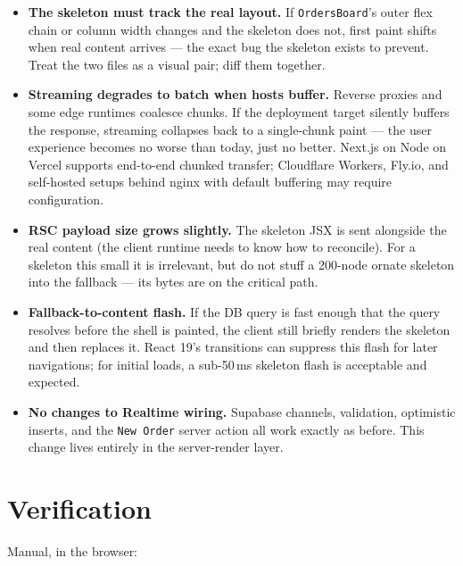 \documentclass[11pt]{article}
\begin{document}
\begin{itemize}[leftmargin=1.4em, itemsep=0.15em]
  \item \textbf{The skeleton must track the real layout.} If \texttt{OrdersBoard}'s outer flex chain or column width changes and the skeleton does not, first paint shifts when real content arrives --- the exact bug the skeleton exists to prevent. Treat the two files as a visual pair; diff them together.
  \item \textbf{Streaming degrades to batch when hosts buffer.} Reverse proxies and some edge runtimes coalesce chunks. If the deployment target silently buffers the response, streaming collapses back to a single-chunk paint --- the user experience becomes no worse than today, just no better. Next.js on Node on Vercel supports end-to-end chunked transfer; Cloudflare Workers, Fly.io, and self-hosted setups behind nginx with default buffering may require configuration.
  \item \textbf{RSC payload size grows slightly.} The skeleton JSX is sent alongside the real content (the client runtime needs to know how to reconcile). For a skeleton this small it is irrelevant, but do not stuff a 200-node ornate skeleton into the fallback --- its bytes are on the critical path.
  \item \textbf{Fallback-to-content flash.} If the DB query is fast enough that the query resolves before the shell is painted, the client still briefly renders the skeleton and then replaces it. React 19's transitions can suppress this flash for later navigations; for initial loads, a sub-50\,ms skeleton flash is acceptable and expected.
  \item \textbf{No changes to Realtime wiring.} Supabase channels, validation, optimistic inserts, and the \texttt{New Order} server action all work exactly as before. This change lives entirely in the server-render layer.
\end{itemize}

\section{Verification}

Manual, in the browser:
\end{document}
